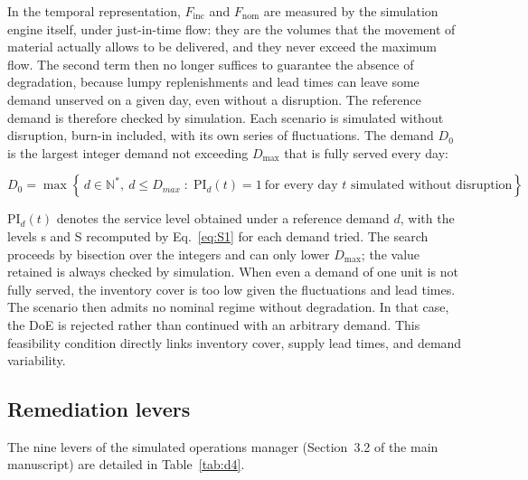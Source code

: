 In the temporal representation, $F_{\mathrm{inc}}$ and $F_{\mathrm{nom}}$ are measured by the simulation engine itself, under just-in-time flow: they are the volumes that the movement of material actually allows to be delivered, and they never exceed the maximum flow. The second term then no longer suffices to guarantee the absence of degradation, because lumpy replenishments and lead times can leave some demand unserved on a given day, even without a disruption. The reference demand is therefore checked by simulation. Each scenario is simulated without disruption, burn-in included, with its own series of fluctuations. The demand $D_{0}$ is the largest integer demand not exceeding $D_{\max}$ that is fully served every day:

\begin{equation}
D_0 = \max\left\{\, d \in \mathbb{N}^*,\ d \le D_{max} \;:\; \mathrm{PI}_d(t) = 1 \ \text{for every day } t \text{ simulated without disruption} \right\}
\label{eq:S3}
\end{equation}

$\mathrm{PI}_{d}(t)$ denotes the service level obtained under a reference demand $d$, with the levels s and S recomputed by Eq.~\eqref{eq:S1} for each demand tried. The search proceeds by bisection over the integers and can only lower $D_{\max}$; the value retained is always checked by simulation. When even a demand of one unit is not fully served, the inventory cover is too low given the fluctuations and lead times. The scenario then admits no nominal regime without degradation. In that case, the DoE is rejected rather than continued with an arbitrary demand. This feasibility condition directly links inventory cover, supply lead times, and demand variability.

\subsection{Remediation levers}
\label{sec:S3.4}

The nine levers of the simulated operations manager (Section~3.2 of the main manuscript) are detailed in Table~\ref{tab:d4}.

